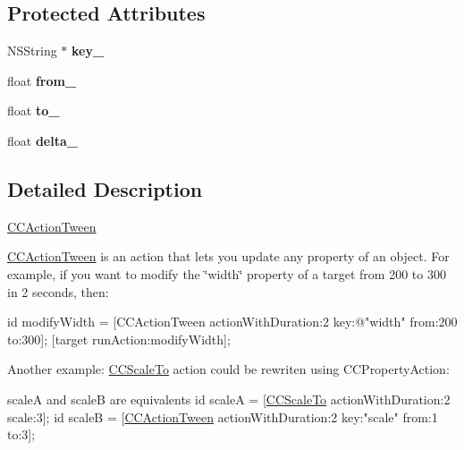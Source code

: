 \subsection*{Protected Attributes}
\begin{DoxyCompactItemize}
\item 
\hypertarget{interface_c_c_action_tween_a1fe24c870dc5e8bad5cc46a9d9278094}{N\-S\-String $\ast$ {\bfseries key\-\_\-}}\label{interface_c_c_action_tween_a1fe24c870dc5e8bad5cc46a9d9278094}

\item 
\hypertarget{interface_c_c_action_tween_a8a72e7122c5e386d8a9a0d54a828b982}{float {\bfseries from\-\_\-}}\label{interface_c_c_action_tween_a8a72e7122c5e386d8a9a0d54a828b982}

\item 
\hypertarget{interface_c_c_action_tween_a548887d37dc1f101f171dbabab8d1bd5}{float {\bfseries to\-\_\-}}\label{interface_c_c_action_tween_a548887d37dc1f101f171dbabab8d1bd5}

\item 
\hypertarget{interface_c_c_action_tween_a99a24ee68436d571fc922bd9d31bdf3f}{float {\bfseries delta\-\_\-}}\label{interface_c_c_action_tween_a99a24ee68436d571fc922bd9d31bdf3f}

\end{DoxyCompactItemize}


\subsection{Detailed Description}
\hyperlink{interface_c_c_action_tween}{C\-C\-Action\-Tween}

\hyperlink{interface_c_c_action_tween}{C\-C\-Action\-Tween} is an action that lets you update any property of an object. For example, if you want to modify the \char`\"{}width\char`\"{} property of a target from 200 to 300 in 2 seconds, then\-: \begin{DoxyVerb}   id modifyWidth = [CCActionTween actionWithDuration:2 key:@"width" from:200 to:300];
   [target runAction:modifyWidth];\end{DoxyVerb}
 Another example\-: \hyperlink{interface_c_c_scale_to}{C\-C\-Scale\-To} action could be rewriten using C\-C\-Property\-Action\-:

scale\-A and scale\-B are equivalents id scale\-A = \mbox{[}\hyperlink{interface_c_c_scale_to}{C\-C\-Scale\-To} action\-With\-Duration\-:2 scale\-:3\mbox{]}; id scale\-B = \mbox{[}\hyperlink{interface_c_c_action_tween}{C\-C\-Action\-Tween} action\-With\-Duration\-:2 key\-:"scale" from\-:1 to\-:3\mbox{]};


